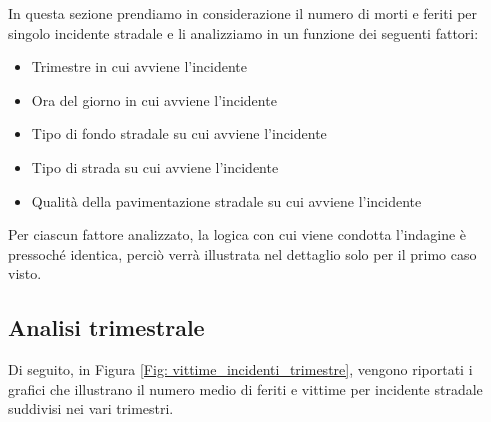 \documentclass[12pt,a4paper,final,oneside]{article}			%
\begin{document}
    In questa sezione prendiamo in considerazione il numero di morti e feriti per singolo incidente stradale e li analizziamo in un funzione dei seguenti fattori:
    \begin{itemize}
        \item Trimestre in cui avviene l’incidente
        \item Ora del giorno in cui avviene l’incidente
        \item Tipo di fondo stradale su cui avviene l’incidente
        \item Tipo di strada su cui avviene l’incidente
        \item Qualità della pavimentazione stradale su cui avviene l’incidente
    \end{itemize}
    Per ciascun fattore analizzato, la logica con cui viene condotta l’indagine è pressoché identica, perciò verrà illustrata nel dettaglio solo per il primo caso visto.
    
    \subsection{Analisi trimestrale}\label{Sec: analisi_trimestrale}
        Di seguito, in Figura \ref{Fig: vittime_incidenti_trimestre}, vengono riportati i grafici che illustrano il numero medio di feriti e vittime per incidente stradale suddivisi nei vari trimestri.
        
\end{document}
